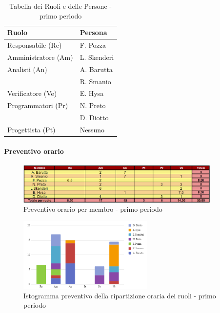 \begin{table}[H]
    \centering
    \begin{tabular}{|l|l|}
        \hline
        \textbf{Ruolo} & \textbf{Persona} \\
        \hline
        \hline
        Responsabile (Re) & F. Pozza \\
        \hline
        Amministratore (Am) & L. Skenderi \\
        \hline
        Analisti (An) & A. Barutta \\
        & R. Smanio \\
        \hline
        Verificatore (Ve) & E. Hysa \\
        \hline
        Programmatori (Pr) & N. Preto \\
        & D. Diotto \\
        \hline
        Progettista (Pt) & Nessuno \\
        \hline
    \end{tabular}
    \caption{Tabella dei Ruoli e delle Persone - primo periodo}
    \label{tab:Ruoli_persone_1}
    \end{table}

\paragraph*{Preventivo orario} \hspace{1pt}

\begin{figure}[H]
    \centering
    \includegraphics[width=0.9\textwidth]{../Images/preventivoOrario1Periodo.png}
    \caption{Preventivo orario per membro - primo periodo}
    \label{fig:Preventivo_orario_1}
\end{figure}

\begin{figure}[H]
    \centering
    \includegraphics[width=0.6\textwidth]{../Images/preventivoDivisioneRuoli1Periodo.png}
    \caption{Istogramma preventivo della ripartizione oraria dei ruoli - primo periodo}
    \label{fig:Preventivo_ripartizione_oraria_1}
\end{figure}

